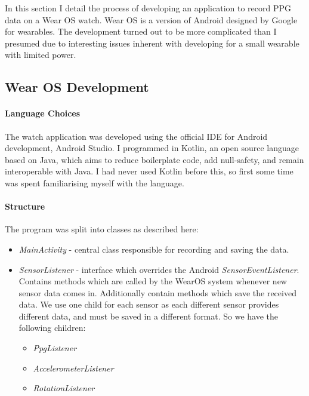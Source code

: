 \documentclass[12pt,a4paper,twoside,openright]{report}
\begin{document}
In this section I detail the process of developing an
application to record PPG data on a Wear OS watch. Wear OS is a version of
Android designed by Google for wearables. The development turned out to be more
complicated than I presumed due to interesting issues inherent with developing for a small
wearable with limited power.

\subsection{Wear OS Development}

\paragraph{Language Choices}

The watch application was developed using the official IDE for Android
development, Android Studio. I programmed in 
Kotlin, an open source language based on Java, which aims to
reduce boilerplate code, add null-safety, and remain interoperable with
Java. I had never used Kotlin before this, so first some time was spent
familiarising myself with the
language.

\paragraph{Structure}

The program was split into classes as described here:

\begin{itemize}
	\item \emph{MainActivity} - central class responsible for 
		recording and saving the data.

	\item \emph{SensorListener} - interface which overrides the Android
		\emph{SensorEventListener}. Contains methods which
		are called by the WearOS system whenever new sensor data comes
		in. Additionally contain methods which save the received data.
		We use one child for each sensor as each different sensor
		provides different data, and must be saved in a different
		format. So we have the following children:

	\begin{itemize}
		\item \emph{PpgListener}
		\item \emph{AccelerometerListener}
		\item \emph{RotationListener}
	\end{itemize}

\end{itemize}
\end{document}
